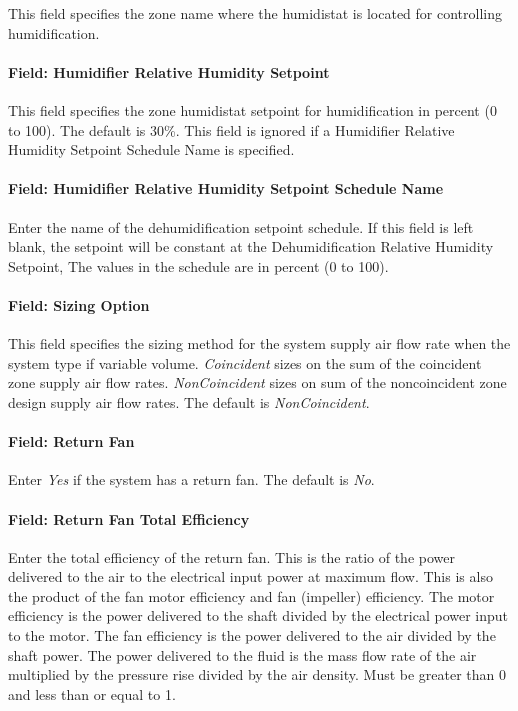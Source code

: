 This field specifies the zone name where the humidistat is located for controlling humidification.

\paragraph{Field: Humidifier Relative Humidity Setpoint}\label{field-humidifier-relative-humidity-setpoint-2}

This field specifies the zone humidistat setpoint for humidification in percent (0 to 100). The default is 30\%. This field is ignored if a Humidifier Relative Humidity Setpoint Schedule Name is specified.

\paragraph{Field: Humidifier Relative Humidity Setpoint Schedule Name}\label{field-humidifier-relative-humidity-setpoint-schedule-name-2}

Enter the name of the dehumidification setpoint schedule. If this field is left blank, the setpoint will be constant at the Dehumidification Relative Humidity Setpoint, The values in the schedule are in percent (0 to 100).

\paragraph{Field: Sizing Option}\label{field-sizing-option-3}

This field specifies the sizing method for the system supply air flow rate when the system type if variable volume. \emph{Coincident} sizes on the sum of the coincident zone supply air flow rates. \emph{NonCoincident} sizes on sum of the noncoincident zone design supply air flow rates. The default is \emph{NonCoincident}.

\paragraph{Field: Return Fan}\label{field-return-fan-4}

Enter \emph{Yes} if the system has a return fan. The default is \emph{No}.

\paragraph{Field: Return Fan Total Efficiency}\label{field-return-fan-total-efficiency-4}

Enter the total efficiency of the return fan. This is the ratio of the power delivered to the air to the electrical input power at maximum flow. This is also the product of the fan motor efficiency and fan (impeller) efficiency. The motor efficiency is the power delivered to the shaft divided by the electrical power input to the motor. The fan efficiency is the power delivered to the air divided by the shaft power. The power delivered to the fluid is the mass flow rate of the air multiplied by the pressure rise divided by the air density. Must be greater than 0 and less than or equal to 1.

